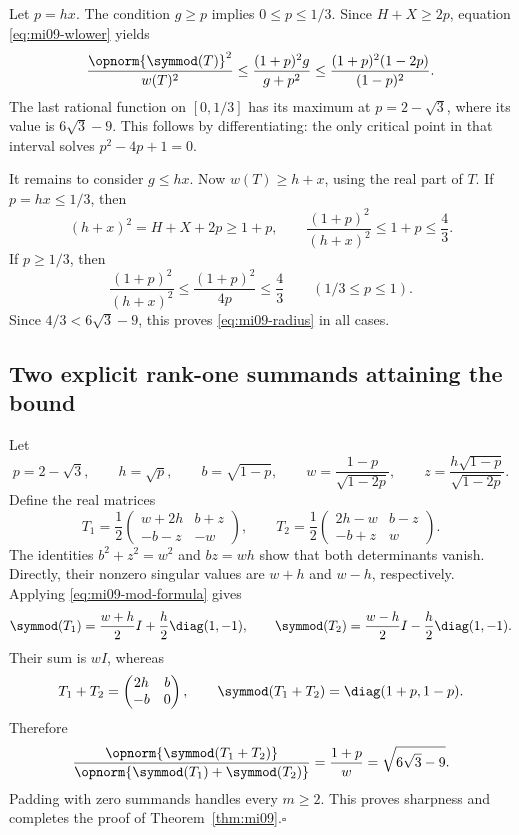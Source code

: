 Let $p=hx$. The condition $g\geq p$ implies $0\leq p\leq1/3$. Since $H+X\geq2p$, equation \eqref{eq:mi09-wlower} yields
\[
 \frac{\opnorm{\symmod(T)}^2}{w(T)^2}
 \leq \frac{(1+p)^2g}{g+p^2}
 \leq\frac{(1+p)^2(1-2p)}{(1-p)^2}.
\]
The last rational function on $[0,1/3]$ has its maximum at $p=2-\sqrt3$, where its value is $6\sqrt3-9$. This follows by differentiating: the only critical point in that interval solves $p^2-4p+1=0$.

It remains to consider $g\leq hx$. Now $w(T)\geq h+x$, using the real part of $T$. If $p=hx\leq1/3$, then
\[
 (h+x)^2=H+X+2p\geq1+p,
 \qquad\frac{(1+p)^2}{(h+x)^2}\leq1+p\leq\frac43.
\]
If $p\geq1/3$, then
\[
 \frac{(1+p)^2}{(h+x)^2}\leq\frac{(1+p)^2}{4p}\leq\frac43
 \qquad(1/3\leq p\leq1).
\]
Since $4/3<6\sqrt3-9$, this proves \eqref{eq:mi09-radius} in all cases.

\subsection{Two explicit rank-one summands attaining the bound}
Let
\[
 p=2-\sqrt3,\qquad h=\sqrt p,\qquad b=\sqrt{1-p},\qquad
 w=\frac{1-p}{\sqrt{1-2p}},\qquad z=\frac{h\sqrt{1-p}}{\sqrt{1-2p}}.
\]
Define the real matrices
\[
 T_1=\frac12\begin{pmatrix}w+2h&b+z\\-b-z&-w\end{pmatrix},\qquad
 T_2=\frac12\begin{pmatrix}2h-w&b-z\\-b+z&w\end{pmatrix}.
\]
The identities $b^2+z^2=w^2$ and $bz=wh$ show that both determinants vanish. Directly, their nonzero singular values are $w+h$ and $w-h$, respectively. Applying \eqref{eq:mi09-mod-formula} gives
\[
 \symmod(T_1)=\frac{w+h}{2}I+\frac h2\diag(1,-1),\qquad
 \symmod(T_2)=\frac{w-h}{2}I-\frac h2\diag(1,-1).
\]
Their sum is $wI$, whereas
\[
 T_1+T_2=\begin{pmatrix}2h&b\\-b&0\end{pmatrix},\qquad
 \symmod(T_1+T_2)=\diag(1+p,1-p).
\]
Therefore
\[
 \frac{\opnorm{\symmod(T_1+T_2)}}{\opnorm{\symmod(T_1)+\symmod(T_2)}}
 =\frac{1+p}{w}=\sqrt{6\sqrt3-9}.
\]
Padding with zero summands handles every $m\geq2$. This proves sharpness and completes the proof of Theorem~\ref{thm:mi09}.\hfill$\square$
